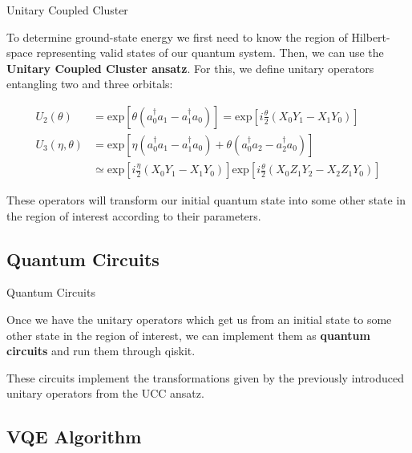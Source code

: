 \documentclass[9pt, handout, aspectratio=169]{beamer}		%
\begin{document}
	\begin{frame}{Unitary Coupled Cluster}

		To determine ground-state energy we first need to know the region of Hilbert-space representing valid states of our quantum system. Then, we can use the \textbf{Unitary Coupled Cluster ansatz}. For this, we define unitary operators entangling two and three orbitals:

		\begin{align*}
			U_2(\theta) &= \text{exp} \left[ \theta(a_0^\dagger a_1 - a_1^\dagger a_0) \right] = \text{exp}\left[ i\frac{\theta}{2}(X_0 Y_1 - X_1 Y_0) \right] \\
			U_3(\eta, \theta) &= \text{exp} \left[ \eta(a_0^\dagger a_1 - a_1^\dagger a_0) + \theta(a_0^\dagger a_2 - a_2^\dagger a_0) \right] \\
			&\simeq \text{exp}\left[ i\frac{\eta}{2}(X_0 Y_1 - X_1 Y_0) \right] \text{exp}\left[ i\frac{\theta}{2}(X_0 Z_1 Y_2 - X_2 Z_1 Y_0) \right]
		\end{align*}

		These operators will transform our initial quantum state into some other state in the region of interest according to their parameters.

	\end{frame}


	\subsection{Quantum Circuits}

	\begin{frame}{Quantum Circuits}

		Once we have the unitary operators which get us from an initial state to some other state in the region of interest, we can implement them as \textbf{quantum circuits} and run them through qiskit.

		\begin{multicols}{2}
			\columnbreak
		\end{multicols}

		These circuits implement the transformations given by the previously introduced unitary operators from the UCC ansatz.

	\end{frame}


	\subsection{VQE Algorithm}
\end{document}
